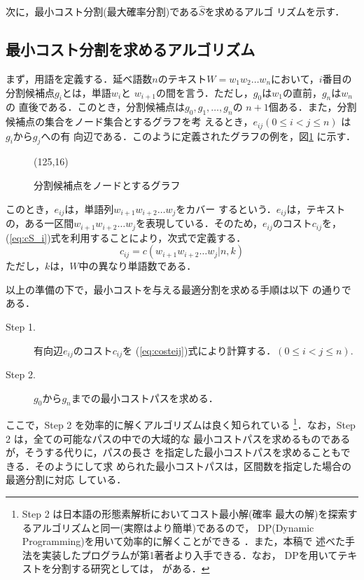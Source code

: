 次に，最小コスト分割(最大確率分割)である$\hat{S}$を求めるアルゴ
リズムを示す．

\subsection{最小コスト分割を求めるアルゴリズム}

まず，用語を定義する．延べ語数$n$のテキスト$W = w_1 w_2 \ldots
w_n$において，$i$番目の分割候補点$g_i$とは，単語$w_{i}$と
$w_{i+1}$の間を言う．ただし，$g_0$は$w_1$の直前，$g_n$は$w_n$の
直後である．このとき，分割候補点は$g_0, g_1, \ldots, g_n$の
$n+1$個ある．また，分割候補点の集合をノード集合とするグラフを考
えるとき，$e_{ij} (0 \le i < j \le n)$ は $g_i$から$g_j$への有
向辺である．このように定義されたグラフの例を，図\ref{fig:graph}
に示す．

\hspace*{1em}

\begin{figure}[htbp]
  \begin{center}
\atari(125,16)
    \caption{分割候補点をノードとするグラフ}
    \label{fig:graph}
  \end{center}
\end{figure}

このとき，$e_{ij}$は，単語列$w_{i+1} w_{i+2} \ldots w_j$をカバー
するという．$e_{ij}$は，テキストの，ある一区間$w_{i+1} w_{i+2}
\ldots w_j$を表現している．そのため，$e_{ij}$のコスト$c_{ij}$を，
(\ref{eq:cS_i})式を利用することにより，次式で定義する．
\begin{equation}
  \label{eq:costeij}
  c_{ij} = c(w_{i+1} w_{i+2} \ldots w_j|n,k)
\end{equation}
ただし，$k$は，$W$中の異なり単語数である．

以上の準備の下で，最小コストを与える最適分割を求める手順は以下
の通りである．
\begin{description}
\item[Step 1.] 有向辺$e_{ij}$のコスト$c_{ij}$を
  (\ref{eq:costeij})式により計算する．$(0 \le i < j \le n).$
\item[Step 2.] $g_0$から$g_n$までの最小コストパスを求める．
\end{description}
ここで，Step 2 を効率的に解くアルゴリズムは良く知られている
\footnote{Step 2 は日本語の形態素解析においてコスト最小解(確率
  最大の解)を探索するアルゴリズムと同一(実際はより簡単)であるので，
  DP(Dynamic Programming)を用いて効率的に解くことができる
  \cite{nagata94:_stoch_japan_morph_analy_using}．また，本稿で
  述べた手法を実装したプログラムが第1著者より入手できる．なお，
  DPを用いてテキストを分割する研究としては，
  \cite{ponte97:_text_segmen_topic,heinonen98:_optim_multi_parag_text_segmen_dynam_progr}
  がある．}．なお，Step 2 は，全ての可能なパスの中での大域的な
最小コストパスを求めるものであるが，そうする代りに，パスの長さ
を指定した最小コストパスを求めることもできる．そのようにして求
められた最小コストパスは，区間数を指定した場合の最適分割に対応
している．

